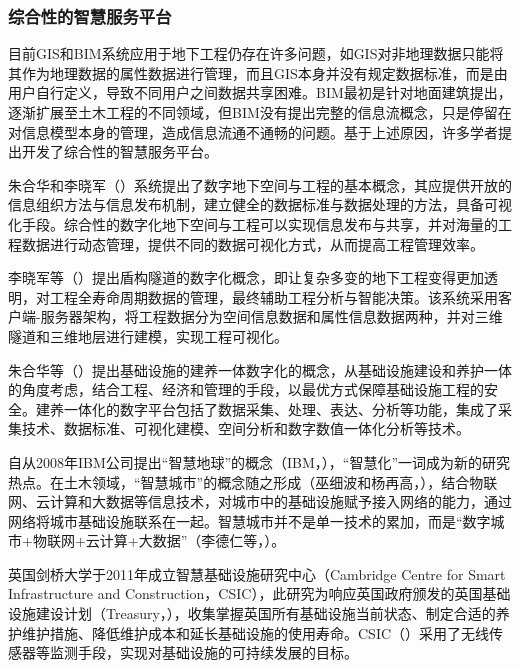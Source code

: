 \subsubsection{综合性的智慧服务平台}

目前GIS和BIM系统应用于地下工程仍存在许多问题，如GIS对非地理数据只能将其作为地理数据的属性数据进行管理，而且GIS本身并没有规定数据标准，而是由用户自行定义，导致不同用户之间数据共享困难。BIM最初是针对地面建筑提出，逐渐扩展至土木工程的不同领域，但BIM没有提出完整的信息流概念，只是停留在对信息模型本身的管理，造成信息流通不通畅的问题。基于上述原因，许多学者提出开发了综合性的智慧服务平台。

朱合华和李晓军（\citeyear{朱合华2007数字地下空间与工程}）系统提出了数字地下空间与工程的基本概念，其应提供开放的信息组织方法与信息发布机制，建立健全的数据标准与数据处理的方法，具备可视化手段。综合性的数字化地下空间与工程可以实现信息发布与共享，并对海量的工程数据进行动态管理，提供不同的数据可视化方式，从而提高工程管理效率。

李晓军等（\citeyear{李晓军2009盾构隧道数字化研究与应用}）提出盾构隧道的数字化概念，即让复杂多变的地下工程变得更加透明，对工程全寿命周期数据的管理，最终辅助工程分析与智能决策。该系统采用客户端-服务器架构，将工程数据分为空间信息数据和属性信息数据两种，并对三维隧道和三维地层进行建模，实现工程可视化。

朱合华等（\citeyear{朱合华2015基础设施建养一体数字化技术}）提出基础设施的建养一体数字化的概念，从基础设施建设和养护一体的角度考虑，结合工程、经济和管理的手段，以最优方式保障基础设施工程的安全。建养一体化的数字平台包括了数据采集、处理、表达、分析等功能，集成了采集技术、数据标准、可视化建模、空间分析和数字数值一体化分析等技术。

自从2008年IBM公司提出“智慧地球”的概念（IBM，\citeyear{IBM2008Wisdom}），“智慧化”一词成为新的研究热点。在土木领域，“智慧城市”的概念随之形成（巫细波和杨再高，\citeyear{巫细波2010智慧城市理念与未来城市发展}），结合物联网、云计算和大数据等信息技术，对城市中的基础设施赋予接入网络的能力，通过网络将城市基础设施联系在一起。智慧城市并不是单一技术的累加，而是“数字城市+物联网+云计算+大数据”（李德仁等，\citeyear{李德仁2013智慧城市的概念}）。

英国剑桥大学于2011年成立智慧基础设施研究中心（Cambridge Centre for Smart Infrastructure and Construction，CSIC），此研究为响应英国政府颁发的英国基础设施建设计划（Treasury，\citeyear{treasury2011national}），收集掌握英国所有基础设施当前状态、制定合适的养护维护措施、降低维护成本和延长基础设施的使用寿命。CSIC（\citeyear{CSIC2011Cambridge}）采用了无线传感器等监测手段，实现对基础设施的可持续发展的目标。

